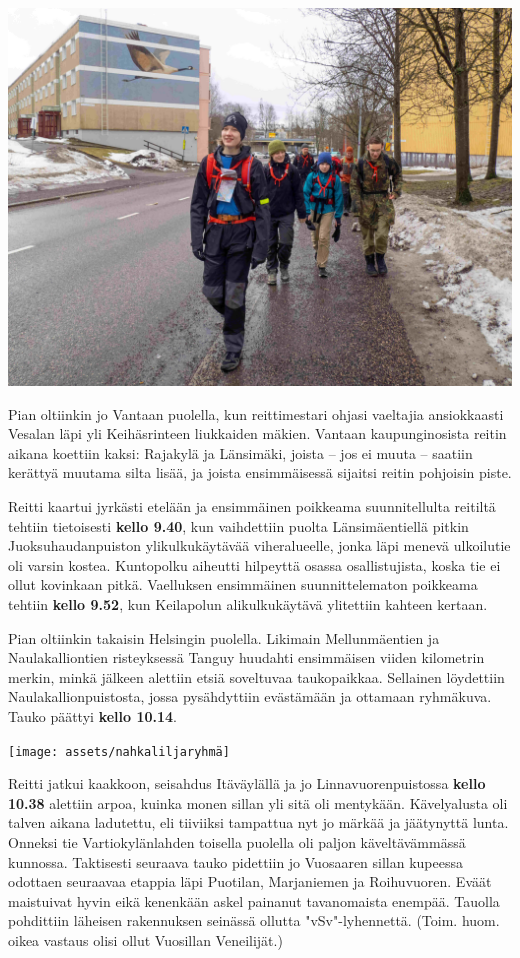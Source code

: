 \begin{multicols}{2}
	\vspace*{0.32cm}
	\noindent\includegraphics[width=\linewidth]{assets/nahkaliljavantaa}

	Pian oltiinkin jo Vantaan puolella, kun reittimestari ohjasi vaeltajia
	ansiokkaasti Vesalan läpi yli Keihäsrinteen liukkaiden mäkien. Vantaan
	kaupunginosista reitin aikana koettiin kaksi: Rajakylä ja Länsimäki,
	joista – jos ei muuta – saatiin kerättyä muutama silta lisää, ja joista
	ensimmäisessä sijaitsi reitin pohjoisin piste.

	Reitti kaartui jyrkästi etelään ja ensimmäinen poikkeama suunnitellulta
	reitiltä tehtiin tietoisesti \textbf{kello 9.40}, kun vaihdettiin
	puolta Länsimäentiellä pitkin Juoksuhaudanpuiston ylikulkukäytävää
	viheralueelle, jonka läpi menevä ulkoilutie oli varsin kostea.
	Kuntopolku aiheutti hilpeyttä osassa osallistujista, koska tie ei ollut
	kovinkaan pitkä. Vaelluksen ensimmäinen suunnittelematon poikkeama
	tehtiin \textbf{kello 9.52}, kun Keilapolun alikulkukäytävä ylitettiin
	kahteen kertaan.

	Pian oltiinkin takaisin Helsingin puolella. Likimain Mellunmäentien ja
	Naulakalliontien risteyksessä Tanguy huudahti ensimmäisen viiden
	kilometrin merkin, minkä jälkeen alettiin etsiä soveltuvaa
	taukopaikkaa. Sellainen löydettiin Naulakallionpuistosta, jossa
	pysähdyttiin evästämään ja ottamaan ryhmäkuva. Tauko päättyi
	\textbf{kello 10.14}.

	\vspace*{0.32cm}
	\noindent\texttt{[image: assets/nahkaliljaryhmä]}

	Reitti jatkui kaakkoon, seisahdus Itäväylällä ja jo
	Linnavuorenpuistossa \textbf{kello 10.38} alettiin arpoa, kuinka monen
	sillan yli sitä oli mentykään. Kävelyalusta oli talven aikana
	ladutettu, eli tiiviiksi tampattua nyt jo märkää ja jäätynyttä lunta.
	Onneksi tie Vartiokylänlahden toisella puolella oli paljon
	käveltävämmässä kunnossa. Taktisesti seuraava tauko pidettiin jo
	Vuosaaren sillan kupeessa odottaen seuraavaa etappia läpi Puotilan,
	Marjaniemen ja Roihuvuoren. Eväät maistuivat hyvin eikä kenenkään askel
	painanut tavanomaista enempää. Tauolla pohdittiin läheisen rakennuksen
	seinässä ollutta "vSv"-lyhennettä. (Toim. huom. oikea vastaus olisi
	ollut Vuosillan Veneilijät.)


\end{multicols}
